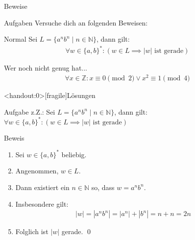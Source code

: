 {
\begin{frame}[fragile]{Beweise}
	\begin{alertblock}{Aufgaben}
		Versuche dich an folgenden Beweisen:
	\end{alertblock}
	\begin{block}{Normal}
		Sei $L = \{a^nb^n \mid n \in \mathbb{N}\}$, dann gilt:
		\begin{align*}
			\forall w \in \{a, b\}^*: \left(w \in L \implies |w| \text{ ist gerade}\right)
		\end{align*}
	\end{block}
	\begin{block}{Wer noch nicht genug hat...}
		\begin{align*}
			\forall x \in \mathbb{Z}: x \equiv 0 \pmod{2} \vee x^2 \equiv 1 \pmod{4}
		\end{align*}
	\end{block}
\end{frame}
}

{
\begin{frame}<handout:0>[fragile]{Lösungen}
	\begin{alertblock}{Aufgabe}
		z.Z.: Sei $L = \{a^nb^n \mid n \in \mathbb{N}\}$, dann gilt:\\
		$\forall w \in \{a, b\}^*: \left(w \in L \implies |w| \text{ ist gerade}\right)$
	\end{alertblock}
	\begin{alertblock}{Beweis}
		\begin{enumerate}
			\item<1-> Sei $w \in \{a,b\}^*$ beliebig.\\
			\item<2-> Angenommen,  $w \in L$.\\
			\item<3-> Dann existiert ein $n \in \mathbb{N}$ so, dass $w = a^nb^n$.\\
			\item<4-> Insbesondere gilt:
			      \begin{align*}
				      |w| = |a^nb^n| = |a^n| + |b^n| = n+n = 2n
			      \end{align*}
			\item<5-> Folglich ist $|w|$ gerade. \qed
		\end{enumerate}
	\end{alertblock}
\end{frame}
}

